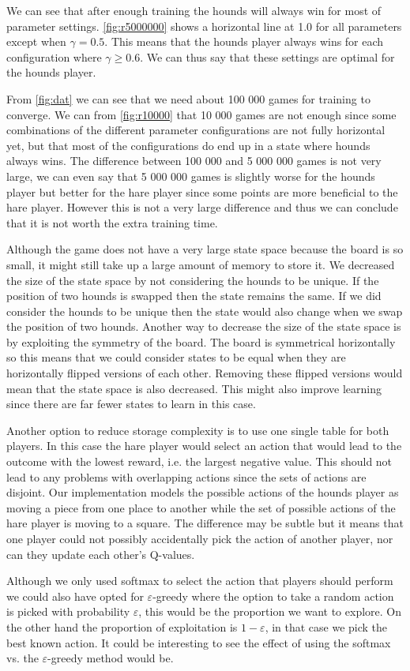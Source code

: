 We can see that after enough training the hounds will always win for most of
parameter settings. \autoref{fig:r5000000} shows a horizontal line at 1.0 for
all parameters except when $\gamma = 0.5$. This means that the hounds player
always wins for each configuration where $\gamma \geq 0.6$. We can thus say
that these settings are optimal for the hounds player.

From \autoref{fig:dat} we can see that we need about 100 000 games for training
to converge. We can from \autoref{fig:r10000} that 10 000 games are not enough
since some combinations of the different parameter configurations are not fully
horizontal yet, but that most of the configurations do end up in a state where
hounds always wins. The difference between 100 000 and 5 000 000 games is not
very large, we can even say that 5 000 000 games is slightly worse for the
hounds player but better for the hare player since some points are more
beneficial to the hare player. However this is not a very large difference and
thus we can conclude that it is not worth the extra training time.

Although the game does not have a very large state space because the board is
so small, it might still take up a large amount of memory to store it. We
decreased the size of the state space by not considering the hounds to be
unique. If the position of two hounds is swapped then the state remains the
same. If we did consider the hounds to be unique then the state would also
change when we swap the position of two hounds. Another way to decrease the
size of the state space is by exploiting the symmetry of the board. The board
is symmetrical horizontally so this means that we could consider states to be
equal when they are horizontally flipped versions of each other. Removing these
flipped versions would mean that the state space is also decreased. This might
also improve learning since there are far fewer states to learn in this case.

Another option to reduce storage complexity is to use one single table for both
players. In this case the hare player would select an action that would lead
to the outcome with the lowest reward, i.e. the largest negative value. This
should not lead to any problems with overlapping actions since the sets of
actions are disjoint. Our implementation models the possible actions of the
hounds player as moving a piece from one place to another while the set of
possible actions of the hare player is moving to a square. The difference
may be subtle but it means that one player could not possibly accidentally
pick the action of another player, nor can they update each other's Q-values.

Although we only used softmax to select the action that players should perform
we could also have opted for $\varepsilon$-greedy where the option to take a
random action is picked with probability $\varepsilon$, this would be the
proportion we want to explore. On the other hand the proportion of exploitation
is $1-\varepsilon$, in that case we pick the best known action. It could be
interesting to see the effect of using the softmax vs. the $\varepsilon$-greedy
method would be.
